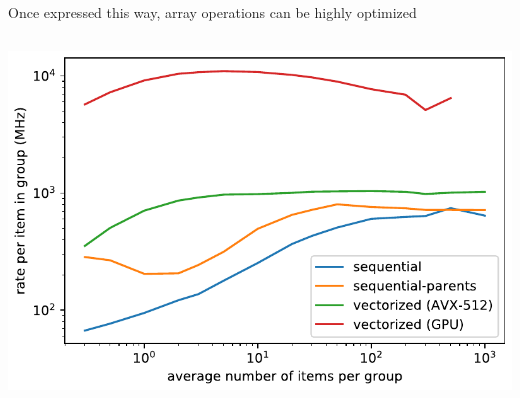 \documentclass[aspectratio=169]{beamer}
\begin{document}
\begin{frame}{Once expressed this way, array operations can be highly optimized}
\begin{columns}
\includegraphics[width=\linewidth]{max_rates_logy.pdf}
\end{columns}
\end{frame}
\end{document}
